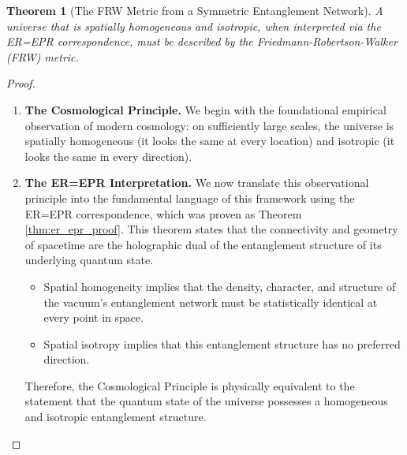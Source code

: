 \documentclass[11pt, letterpaper]{report}
\theoremstyle{plain} %
\newtheorem{theorem}{Theorem}[chapter]
\theoremstyle{definition} %
\theoremstyle{remark} %
\begin{document}
\begin{theorem}[The FRW Metric from a Symmetric Entanglement Network]
A universe that is spatially homogeneous and isotropic, when interpreted via the ER=EPR correspondence, must be described by the Friedmann-Robertson-Walker (FRW) metric.
\end{theorem}
\begin{proof}
\begin{enumerate}
    \item \textbf{The Cosmological Principle.} We begin with the foundational empirical observation of modern cosmology: on sufficiently large scales, the universe is spatially homogeneous (it looks the same at every location) and isotropic (it looks the same in every direction).

    \item \textbf{The ER=EPR Interpretation.} We now translate this observational principle into the fundamental language of this framework using the ER=EPR correspondence, which was proven as Theorem \ref{thm:er_epr_proof}. This theorem states that the connectivity and geometry of spacetime are the holographic dual of the entanglement structure of its underlying quantum state.
    \begin{itemize}
        \item Spatial homogeneity implies that the density, character, and structure of the vacuum's entanglement network must be statistically identical at every point in space.
        \item Spatial isotropy implies that this entanglement structure has no preferred direction.
    \end{itemize}
    Therefore, the Cosmological Principle is physically equivalent to the statement that the quantum state of the universe possesses a homogeneous and isotropic entanglement structure.


\end{enumerate}
\end{proof}
\end{document}
